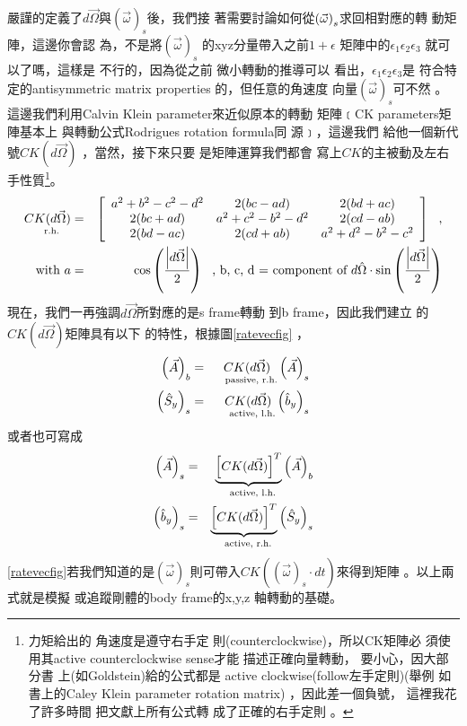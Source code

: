 \documentclass[12pt,a4paper]{article}
\begin{document}
嚴謹的定義了$d\vec{\Omega}$與$%
\left( \vec{\omega}\right) _{s}$後，我們接%
著需要討論如何從$\left( \vec{%
\omega}\right) _{s}$求回相對應的轉%
動矩陣，這邊你會認%
為，不是將$\left( \vec{\omega}\right) _{s}$%
的xyz分量帶入之前$1+\epsilon $%
矩陣中的$\epsilon _{1}\epsilon _{2}\epsilon _{3}$%
就可以了嗎，這樣是%
不行的，因為從之前%
微小轉動的推導可以%
看出，$\epsilon _{1}\epsilon _{2}\epsilon _{3}$是%
符合特定的antisymmetric matrix properties%
的，但任意的角速度%
向量$\left( \vec{\omega}\right) _{s}$可不然%
。這邊我們利用Calvin Klein
parameter來近似原本的轉動%
矩陣﹝CK parameters矩陣基本上%
與轉動公式Rodrigues rotation formula同%
源\cite{goldstein}﹞，這邊我們%
給他一個新代號$CK(d\vec{\Omega})$%
，當然，接下來只要%
是矩陣運算我們都會%
寫上$CK$的主被動及左右%
手性質\footnote{力矩給出的%
角速度是遵守右手定%
則(counterclockwise)，所以CK矩陣必%
須使用其active counterclockwise sense才能%
描述正確向量轉動，%
要小心，因大部分書%
上(如Goldstein)給的公式都是%
active clockwise(follow左手定則)(舉例%
如書上的Caley Klein parameter rotation matrix)%
，因此差一個負號，%
這裡我花了許多時間%
把文獻上所有公式轉%
成了正確的右手定則%
。}。%
\begin{eqnarray*}
\underset{\text{r.h.}}{CK(d\vec{\Omega})} &=&\left[ 
\begin{array}{ccc}
a^{2}+b^{2}-c^{2}-d^{2} & 2(bc-ad) & 2(bd+ac) \\ 
2(bc+ad) & a^{2}+c^{2}-b^{2}-d^{2} & 2(cd-ab) \\ 
2(bd-ac) & 2(cd+ab) & a^{2}+d^{2}-b^{2}-c^{2}%
\end{array}%
\right] \text{,} \\
\text{with }a &=&\cos \left( \frac{\left\vert d\vec{\Omega}\right\vert }{2}%
\right) \text{, b, c, d = component of }d\hat{\Omega}\cdot \sin \left( \frac{%
\left\vert d\vec{\Omega}\right\vert }{2}\right)
\end{eqnarray*}%
現在，我們一再強調$d%
\vec{\Omega}$所對應的是s frame轉動%
到b frame，因此我們建立%
的$CK(d\vec{\Omega})$矩陣具有以下%
的特性，根據圖\ref{ratevecfig}%
，%
\begin{eqnarray*}
\left( \vec{A}\right) _{b} &=&\underset{\text{passive, r.h.}}{CK(d\vec{\Omega%
})}\left( \vec{A}\right) _{s} \\
\left( \hat{S}_{y}\right) _{s} &=&\underset{\text{active, l.h.}}{CK(d\vec{%
\Omega})}\left( \hat{b}_{y}\right) _{s}
\end{eqnarray*}%
或者也可寫成%
\begin{eqnarray}
\left( \vec{A}\right) _{s} &=&\underset{\text{active, l.h.}}{\underbrace{%
\left[ CK(d\vec{\Omega})\right] ^{T}}}\left( \vec{A}\right) _{b}
\label{frametrans} \\
\left( \hat{b}_{y}\right) _{s} &=&\underset{\text{active, r.h.}}{\underbrace{%
\left[ CK(d\vec{\Omega})\right] ^{T}}}\left( \hat{S}_{y}\right) _{s}
\label{vecrot}
\end{eqnarray}%
\ref{ratevecfig}若我們知道的是$%
\left( \vec{\omega}\right) _{s}$則可帶入$CK(\left( 
\vec{\omega}\right) _{s}\cdot dt)$來得到矩陣%
。以上兩式就是模擬%
或追蹤剛體的body frame的x,y,z%
軸轉動的基礎。
\end{document}
